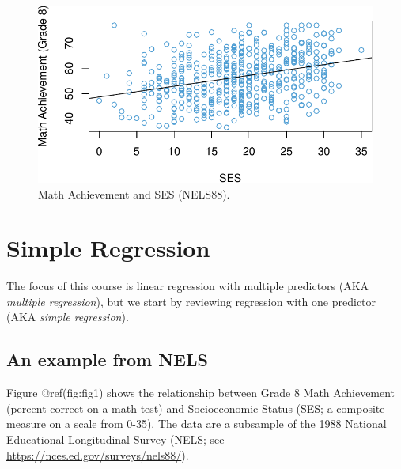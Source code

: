 \documentclass[
  letterpaper,
  DIV=11,
  numbers=noendperiod]{scrreprt}
\begin{document}
\begin{figure}[H]

{\centering \includegraphics{ch1_review_files/figure-pdf/fig-nels-1-1.pdf}

}

\caption{\label{fig-nels-1}Math Achievement and SES (NELS88).}

\end{figure}


\hypertarget{sec-chap-2}{%
\chapter{Simple Regression}\label{sec-chap-2}}

The focus of this course is linear regression with multiple predictors
(AKA \emph{multiple regression}), but we start by reviewing regression
with one predictor (AKA \emph{simple regression}).

\hypertarget{example-2}{%
\section{An example from NELS}\label{example-2}}

Figure @ref(fig:fig1) shows the relationship between Grade 8 Math
Achievement (percent correct on a math test) and Socioeconomic Status
(SES; a composite measure on a scale from 0-35). The data are a
subsample of the 1988 National Educational Longitudinal Survey (NELS;
see \url{https://nces.ed.gov/surveys/nels88/}).
\end{document}

